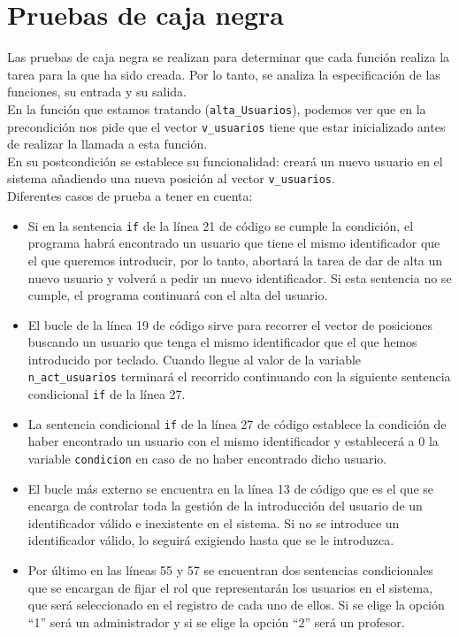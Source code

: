 \documentclass{book}
\begin{document}
\section{Pruebas de caja negra}
Las pruebas de caja negra se realizan para determinar que cada función realiza la tarea para la que ha sido creada. Por lo tanto, se analiza la especificación de las funciones, su entrada y su salida.\\
En la función que estamos tratando (\texttt{alta\_Usuarios}), podemos ver que en la precondición nos pide que el vector \texttt{v\_usuarios} tiene que estar inicializado antes de realizar la llamada a esta función.\\
En su postcondición se establece su funcionalidad: creará un nuevo usuario en el sistema añadiendo una nueva posición al vector \texttt{v\_usuarios}.\\
Diferentes casos de prueba a tener en cuenta:
\begin{itemize}
	\item Si en la sentencia \texttt{if} de la línea 21 de código se cumple la condición, el programa habrá encontrado un usuario que tiene el mismo identificador que el que queremos introducir, por lo tanto, abortará la tarea de dar de alta un nuevo usuario y volverá a pedir un nuevo identificador. Si esta sentencia no se cumple, el programa continuará con el alta del usuario.
	\item El bucle de la línea 19 de código sirve para recorrer el vector de posiciones buscando un usuario que tenga el mismo identificador que el que hemos introducido por teclado. Cuando llegue al valor de la variable \texttt{n\_act\_usuarios} terminará el recorrido continuando con la siguiente sentencia condicional \texttt{if} de la línea 27.
	\item La sentencia condicional \texttt{if} de la línea 27 de código establece la condición de haber encontrado un usuario con el mismo identificador y establecerá a 0 la variable \texttt{condicion} en caso de no haber encontrado dicho usuario.
	\item El bucle más externo se encuentra en la línea 13 de código que es el que se encarga de controlar toda la gestión de la introducción del usuario de un identificador válido e inexistente en el sistema. Si no se introduce un identificador válido, lo seguirá exigiendo hasta que se le introduzca.
	\item Por último en las líneas 55 y 57 se encuentran dos sentencias condicionales que se encargan de fijar el rol que representarán los usuarios en el sistema, que será seleccionado en el registro de cada uno de ellos. Si se elige la opción ``1'' será un administrador y si se elige la opción ``2'' será un profesor.
\end{itemize}
\end{document}
